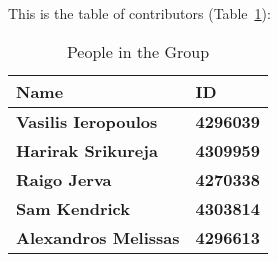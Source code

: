 This is the table of contributors (Table~\ref{authors}):
\begin{table}%
\centering
\caption{People in the Group}
\label{authors}
\begin{tabular}{|l|l|}
\textbf{Name} & \textbf{ID} \\
\hline
\textbf{Vasilis Ieropoulos} & \textbf{4296039} \\
\hline 
\textbf{Harirak Srikureja} & \textbf{4309959} \\
\hline
\textbf{Raigo Jerva} & \textbf{4270338} \\
\hline
\textbf{Sam Kendrick} & \textbf{4303814} \\
\hline
\textbf{Alexandros Melissas} & \textbf{4296613} \\
\hline
\end{tabular}
\end{table}
